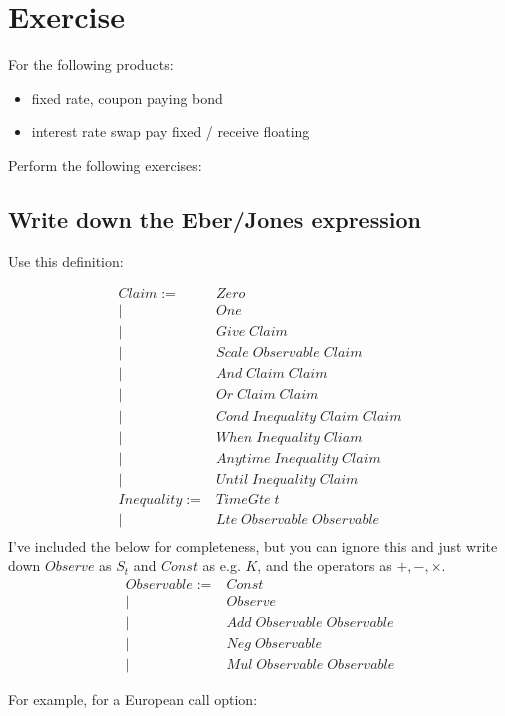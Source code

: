 \documentclass[a4paper]{article}
\begin{document}
\section{Exercise}
For the following products:

\begin{itemize}
\item fixed rate, coupon paying bond
\item interest rate swap pay fixed / receive floating
\end{itemize}

Perform the following exercises:

\subsection{Write down the Eber/Jones expression}

Use this definition:

\begin{align*}
Claim := & Zero \\
|& One \\
|& Give \; Claim \\
|& Scale \; Observable \; Claim \\
|& And \; Claim \; Claim \\
|& Or \; Claim \; Claim \\
|& Cond \; Inequality \; Claim \; Claim \\
|& When \; Inequality \; Cliam \\
|& Anytime \; Inequality \; Claim \\
|& Until \; Inequality \; Claim \\
Inequality := & TimeGte \; t \\
| & Lte \; Observable \; Observable \\
\end{align*}
I've included the below for completeness, but you can ignore this and just write down $Observe$ as $S_t$ and $Const$ as e.g. $K$, and the operators as $+, -, \times$.
\begin{align*}
Observable := & Const \\
| & Observe \\
| & Add \; Observable \; Observable \\
| & Neg \; Observable \\
| & Mul \; Observable \; Observable
\end{align*}


For example, for a European call option:
\end{document}
